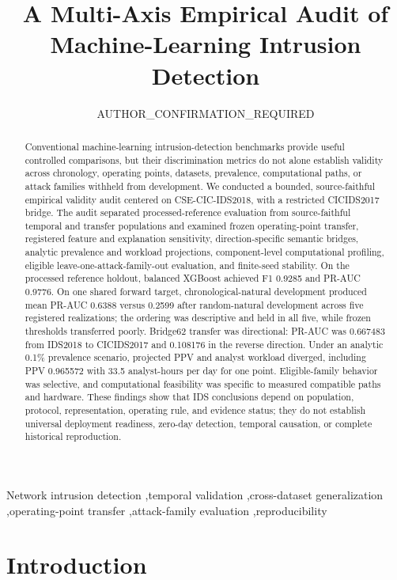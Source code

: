 \documentclass[preprint,12pt]{elsarticle}
\begin{document}
\begin{frontmatter}
\title{A Multi-Axis Empirical Audit of Machine-Learning Intrusion Detection}
\author[anon]{AUTHOR\_CONFIRMATION\_REQUIRED}
\address[anon]{AUTHOR\_CONFIRMATION\_REQUIRED}
\begin{abstract}
Conventional machine-learning intrusion-detection benchmarks provide useful controlled comparisons, but their discrimination metrics do not alone establish validity across chronology, operating points, datasets, prevalence, computational paths, or attack families withheld from development. We conducted a bounded, source-faithful empirical validity audit centered on CSE-CIC-IDS2018, with a restricted CICIDS2017 bridge. The audit separated processed-reference evaluation from source-faithful temporal and transfer populations and examined frozen operating-point transfer, registered feature and explanation sensitivity, direction-specific semantic bridges, analytic prevalence and workload projections, component-level computational profiling, eligible leave-one-attack-family-out evaluation, and finite-seed stability. On the processed reference holdout, balanced XGBoost achieved F1 0.9285 and PR-AUC 0.9776. On one shared forward target, chronological-natural development produced mean PR-AUC 0.6388 versus 0.2599 after random-natural development across five registered realizations; the ordering was descriptive and held in all five, while frozen thresholds transferred poorly. Bridge62 transfer was directional: PR-AUC was 0.667483 from IDS2018 to CICIDS2017 and 0.108176 in the reverse direction. Under an analytic 0.1\% prevalence scenario, projected PPV and analyst workload diverged, including PPV 0.965572 with 33.5 analyst-hours per day for one point. Eligible-family behavior was selective, and computational feasibility was specific to measured compatible paths and hardware. These findings show that IDS conclusions depend on population, protocol, representation, operating rule, and evidence status; they do not establish universal deployment readiness, zero-day detection, temporal causation, or complete historical reproduction.
\end{abstract}
\begin{keyword}
Network intrusion detection \sep temporal validation \sep cross-dataset generalization \sep operating-point transfer \sep attack-family evaluation \sep reproducibility
\end{keyword}
\end{frontmatter}


\section{Introduction}
\end{document}
